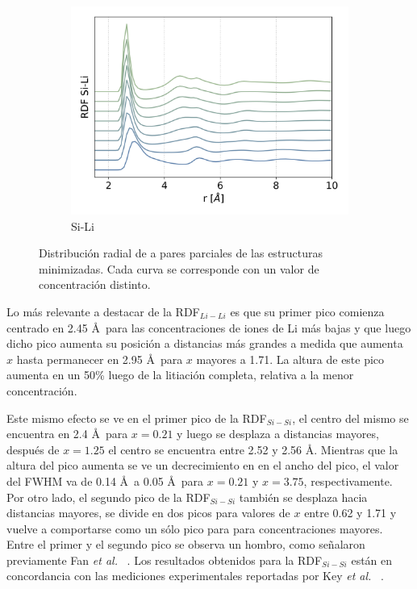 \begin{figure}[h!]
\begin{subfigure}{.475\textwidth}
        \centering
        \includegraphics[width=\textwidth]{caracterizacion/resultados/rdf/rdf-SiLi.png}
        \caption{Si-Li}
        \label{fig:rdf-SiLi}
    \end{subfigure}
    \caption{Distribución radial de a pares parciales de las estructuras 
    minimizadas. Cada curva se corresponde con un valor de concentración
    distinto.}
    \label{fig:rdf}
\end{figure}

Lo más relevante a destacar de la RDF$_{Li-Li}$ es que su primer pico comienza 
centrado en 2.45 \AA\ para las concentraciones de iones de Li más bajas y que 
luego dicho pico aumenta su posición a distancias más grandes a medida que aumenta
$x$ hasta permanecer en 2.95 \AA\ para $x$ mayores a 1.71. La altura de este pico
aumenta en un 50\% luego de la litiación completa, relativa a la menor 
concentración.

Este mismo efecto se ve en el primer pico de la RDF$_{Si-Si}$, el centro del mismo
se encuentra en 2.4 \AA\ para $x = 0.21$ y luego se desplaza a distancias
mayores, después de $x = 1.25$ el centro se encuentra entre 2.52 y 2.56 \AA.
Mientras que la altura del pico aumenta se ve un decrecimiento en en el ancho 
del pico, el valor del FWHM va de 0.14 \AA\ a 0.05 \AA\ para $x = 0.21$ y 
$x = 3.75$, respectivamente. Por otro lado, el segundo pico de la RDF$_{Si-Si}$
también se desplaza hacia distancias mayores, se divide en dos picos para valores 
de $x$ entre 0.62 y 1.71 y vuelve a comportarse como un sólo pico para para 
concentraciones mayores. Entre el primer y el segundo pico se observa un hombro,
como señalaron previamente Fan \textit{et al.} ~\cite{fan2013}. Los resultados 
obtenidos para la RDF$_{Si-Si}$ están en concordancia con las mediciones 
experimentales reportadas por Key \textit{et al.} ~\cite{key2011}.


